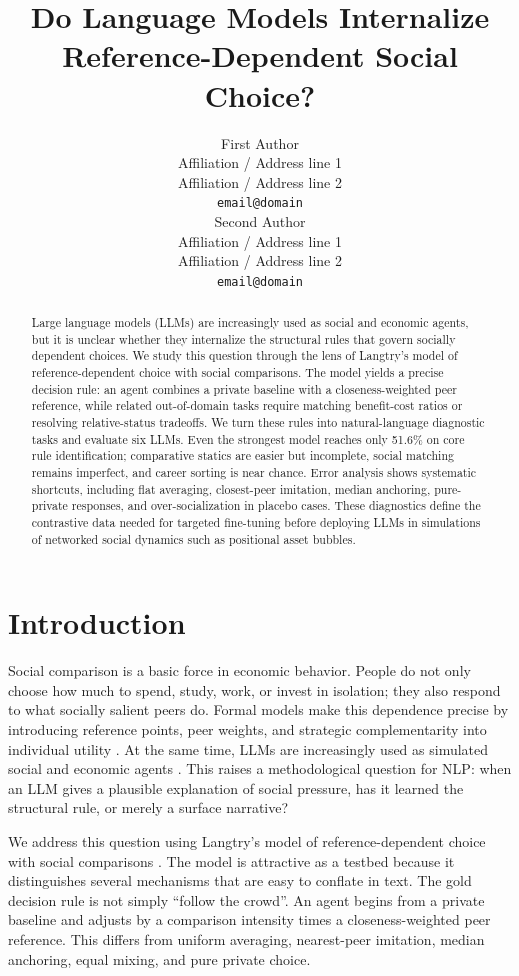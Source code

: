 \documentclass[11pt]{article}
\title{Do Language Models Internalize Reference-Dependent Social Choice?}
\author{First Author \\
  Affiliation / Address line 1 \\
  Affiliation / Address line 2 \\
  \texttt{email@domain} \\\And
  Second Author \\
  Affiliation / Address line 1 \\
  Affiliation / Address line 2 \\
  \texttt{email@domain} \\}
\begin{document}
\maketitle

\begin{abstract}
Large language models (LLMs) are increasingly used as social and economic agents, but it is unclear whether they internalize the structural rules that govern socially dependent choices.
We study this question through the lens of Langtry's model of reference-dependent choice with social comparisons.
The model yields a precise decision rule: an agent combines a private baseline with a closeness-weighted peer reference, while related out-of-domain tasks require matching benefit-cost ratios or resolving relative-status tradeoffs.
We turn these rules into natural-language diagnostic tasks and evaluate six LLMs.
Even the strongest model reaches only 51.6\% on core rule identification; comparative statics are easier but incomplete, social matching remains imperfect, and career sorting is near chance.
Error analysis shows systematic shortcuts, including flat averaging, closest-peer imitation, median anchoring, pure-private responses, and over-socialization in placebo cases.
These diagnostics define the contrastive data needed for targeted fine-tuning before deploying LLMs in simulations of networked social dynamics such as positional asset bubbles.
\end{abstract}

\section{Introduction}

Social comparison is a basic force in economic behavior.
People do not only choose how much to spend, study, work, or invest in isolation; they also respond to what socially salient peers do.
Formal models make this dependence precise by introducing reference points, peer weights, and strategic complementarity into individual utility \cite{clark2008relative, hopkins2004running, langtry2023keeping}.
At the same time, LLMs are increasingly used as simulated social and economic agents \cite{horton2023large, zhou2024real, manning2026general}.
This raises a methodological question for NLP: when an LLM gives a plausible explanation of social pressure, has it learned the structural rule, or merely a surface narrative?

We address this question using Langtry's model of reference-dependent choice with social comparisons \cite{langtry2023keeping}.
The model is attractive as a testbed because it distinguishes several mechanisms that are easy to conflate in text.
The gold decision rule is not simply ``follow the crowd''.
An agent begins from a private baseline and adjusts by a comparison intensity times a closeness-weighted peer reference.
This differs from uniform averaging, nearest-peer imitation, median anchoring, equal mixing, and pure private choice.
\end{document}

